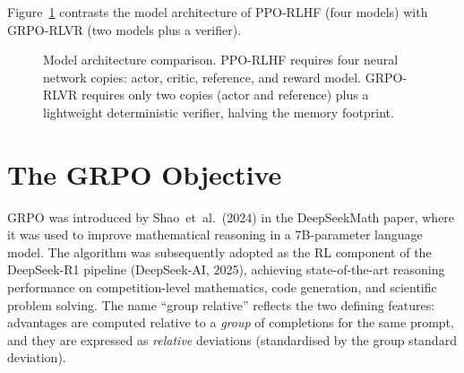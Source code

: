 Figure~\ref{fig:grpo-architecture} contrasts the model architecture of PPO-RLHF (four models) with GRPO-RLVR (two models plus a verifier).

\begin{figure}[ht]
\centering
{}
\caption{Model architecture comparison.  PPO-RLHF requires four neural network copies: actor, critic, reference, and reward model.  GRPO-RLVR requires only two copies (actor and reference) plus a lightweight deterministic verifier, halving the memory footprint.}
\label{fig:grpo-architecture}
\end{figure}

\section{The GRPO Objective}
\label{sec:grpo-objective}

GRPO was introduced by Shao~et~al.\ (2024) in the DeepSeekMath paper, where it was used to improve mathematical reasoning in a 7B-parameter language model.  The algorithm was subsequently adopted as the RL component of the DeepSeek-R1 pipeline (DeepSeek-AI, 2025), achieving state-of-the-art reasoning performance on competition-level mathematics, code generation, and scientific problem solving.  The name ``group relative'' reflects the two defining features: advantages are computed relative to a \emph{group} of completions for the same prompt, and they are expressed as \emph{relative} deviations (standardised by the group standard deviation).

